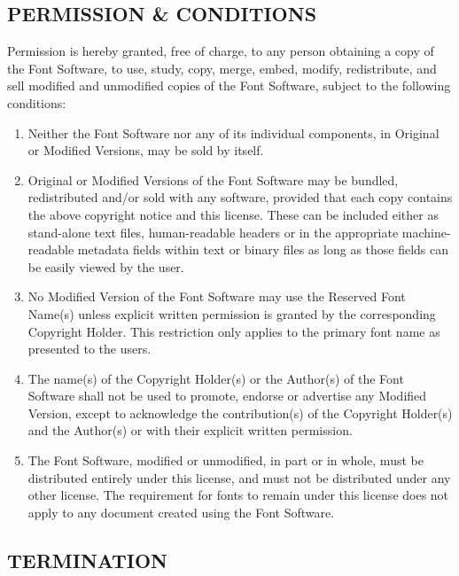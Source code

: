 \documentclass[12pt,a4paper,openany]{article}
\newcommand{\pageheader}[1]{%
	\clearpage
	\pagestyle{fancy}
	\lhead{\LARGE\bfseries#1}
	\cfoot{}
}
\begin{document}
\subsection*{PERMISSION \& CONDITIONS}

Permission is hereby granted, free of charge, to any person obtaining
a copy of the Font Software, to use, study, copy, merge, embed, modify,
redistribute, and sell modified and unmodified copies of the Font
Software, subject to the following conditions:

\pageheader{SIL Open Font License}

\begin{enumerate}

\item Neither the Font Software nor any of its individual components,
in Original or Modified Versions, may be sold by itself.

\item Original or Modified Versions of the Font Software may be bundled,
redistributed and/or sold with any software, provided that each copy
contains the above copyright notice and this license. These can be
included either as stand-alone text files, human-readable headers or
in the appropriate machine-readable metadata fields within text or
binary files as long as those fields can be easily viewed by the user.

\item No Modified Version of the Font Software may use the Reserved Font
Name(s) unless explicit written permission is granted by the corresponding
Copyright Holder. This restriction only applies to the primary font name as
presented to the users.

\item The name(s) of the Copyright Holder(s) or the Author(s) of the Font
Software shall not be used to promote, endorse or advertise any
Modified Version, except to acknowledge the contribution(s) of the
Copyright Holder(s) and the Author(s) or with their explicit written
permission.

\item The Font Software, modified or unmodified, in part or in whole,
must be distributed entirely under this license, and must not be
distributed under any other license. The requirement for fonts to
remain under this license does not apply to any document created
using the Font Software.

\end{enumerate}

\subsection*{TERMINATION}
\end{document}
